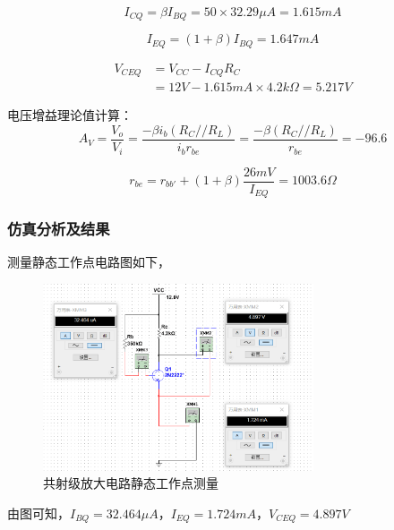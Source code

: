 \documentclass[10pt, conference, compsocconf, a4paper]{IEEEtran}
\begin{document}
\begin{equation}
  I_{CQ}=\beta I_{BQ}=50\times32.29\mu A=1.615mA
\end{equation}

\begin{equation}
  I_{EQ}=(1+\beta)I_{BQ}=1.647mA
\end{equation}

\begin{equation}
  \begin{split}
    V_{CEQ}&=V_{CC}-I_{CQ}R_C\\
    &=12V-1.615mA\times 4.2k\Omega=5.217V
  \end{split}
\end{equation}

电压增益理论值计算：
\begin{equation}
  A_V=\frac{V_o}{V_i}=\frac{-\beta i_b(R_C//R_L)}{i_br_{be}}=\frac{-\beta(R_C//R_L)}{r_{be}}=-96.6
\end{equation}

\begin{equation}
  r_{be}=r_{bb'}+(1+\beta)\frac{26mV}{I_{EQ}}=1003.6\Omega
\end{equation}

\subsubsection{仿真分析及结果}

测量静态工作点电路图如下，\par
\begin{figure}[h]
  \includegraphics[width=8cm]{img/a.png}
  \caption{共射级放大电路静态工作点测量}
  \label{共射级放大电路静态工作点测量}
\end{figure}
由图可知，$I_{BQ}=32.464\mu A，I_{EQ}=1.724mA，V_{CEQ}=4.897V$
\end{document}

